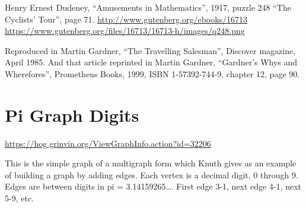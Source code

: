 \documentclass{article}
\begin{document}
Henry Ernest Dudeney, ``Amusements in Mathematics'', 1917, puzzle 248
``The Cyclists' Tour'', page 71.\newline
\url{http://www.gutenberg.org/ebooks/16713}\newline
\url{https://www.gutenberg.org/files/16713/16713-h/images/q248.png}

Reproduced in Martin Gardner, ``The Travelling Salesman'', Discover
magazine, April 1985.  And that article reprinted in Martin Gardner,
``Gardner's Whys and Wherefores'', Prometheus Books, 1999, ISBN
1-57392-744-9, chapter 12, page 90.

\begin{center}
\end{center}


\clearpage
\section{Pi Graph Digits}

\url{https://hog.grinvin.org/ViewGraphInfo.action?id=32206}

\smallskip

This is the simple graph of a multigraph form which Knuth gives as an
example of building a graph by adding edges.  Each vertex is a decimal
digit, 0 through 9.  Edges are between digits in pi = 3.14159265\dots.
First edge 3-1, next edge 4-1, next 5-9, etc.
\end{document}
